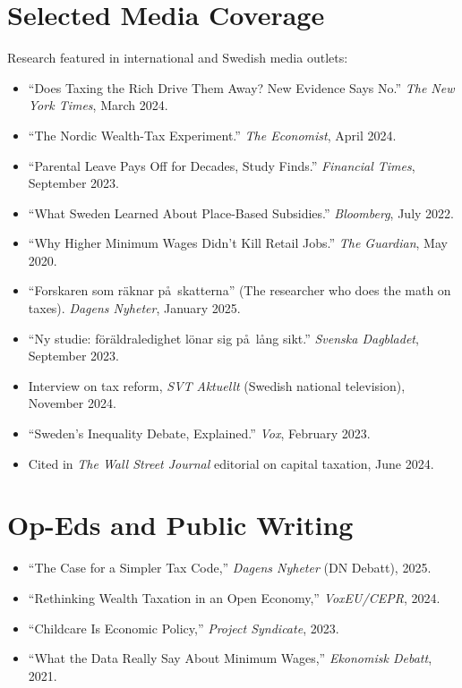 \documentclass[11pt]{article}
\begin{document}
\section{Selected Media Coverage}
Research featured in international and Swedish media outlets:
\begin{itemize}
\item ``Does Taxing the Rich Drive Them Away? New Evidence Says No.'' \emph{The New York Times}, March 2024.
\item ``The Nordic Wealth-Tax Experiment.'' \emph{The Economist}, April 2024.
\item ``Parental Leave Pays Off for Decades, Study Finds.'' \emph{Financial Times}, September 2023.
\item ``What Sweden Learned About Place-Based Subsidies.'' \emph{Bloomberg}, July 2022.
\item ``Why Higher Minimum Wages Didn't Kill Retail Jobs.'' \emph{The Guardian}, May 2020.
\item ``Forskaren som r\"aknar p\aa\ skatterna'' (The researcher who does the math on taxes). \emph{Dagens Nyheter}, January 2025.
\item ``Ny studie: f\"or\"aldraledighet l\"onar sig p\aa\ l\aa ng sikt.'' \emph{Svenska Dagbladet}, September 2023.
\item Interview on tax reform, \emph{SVT Aktuellt} (Swedish national television), November 2024.
\item ``Sweden's Inequality Debate, Explained.'' \emph{Vox}, February 2023.
\item Cited in \emph{The Wall Street Journal} editorial on capital taxation, June 2024.
\end{itemize}

\section{Op-Eds and Public Writing}
\begin{itemize}
\item ``The Case for a Simpler Tax Code,'' \emph{Dagens Nyheter} (DN Debatt), 2025.
\item ``Rethinking Wealth Taxation in an Open Economy,'' \emph{VoxEU/CEPR}, 2024.
\item ``Childcare Is Economic Policy,'' \emph{Project Syndicate}, 2023.
\item ``What the Data Really Say About Minimum Wages,'' \emph{Ekonomisk Debatt}, 2021.
\end{itemize}
\end{document}
